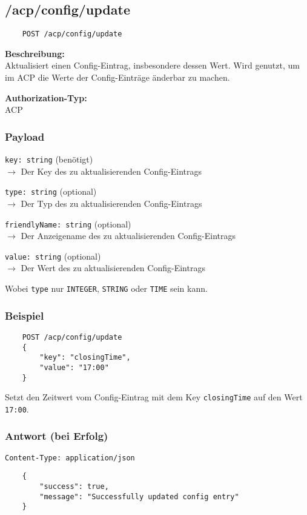 \subsection{/acp/config/update}

\begin{lstlisting}
    POST /acp/config/update
\end{lstlisting}

\textbf{Beschreibung:} \\
Aktualisiert einen Config-Eintrag, insbesondere dessen Wert. Wird genutzt, um im ACP die Werte der Config-Einträge änderbar zu machen.

\textbf{Authorization-Typ:} \\
ACP

\subsubsection{Payload}

\lstinline{key: string} (benötigt) \\
$\rightarrow$ Der Key des zu aktualisierenden Config-Eintrags

\lstinline{type: string} (optional) \\
$\rightarrow$ Der Typ des zu aktualisierenden Config-Eintrags

\lstinline{friendlyName: string} (optional) \\
$\rightarrow$ Der Anzeigename des zu aktualisierenden Config-Eintrags

\lstinline{value: string} (optional) \\
$\rightarrow$ Der Wert des zu aktualisierenden Config-Eintrags

Wobei \lstinline{type} nur \lstinline{INTEGER}, \lstinline{STRING} oder \lstinline{TIME} sein kann.

\subsubsection{Beispiel}

\begin{lstlisting}
    POST /acp/config/update
    {
        "key": "closingTime",
        "value": "17:00"
    }
\end{lstlisting}

Setzt den Zeitwert vom Config-Eintrag mit dem Key \lstinline{closingTime} auf den Wert \lstinline{17:00}.

\subsubsection{Antwort (bei Erfolg)}

\lstinline{Content-Type: application/json}
\begin{lstlisting}
    {
        "success": true, 
        "message": "Successfully updated config entry"
    }
\end{lstlisting}